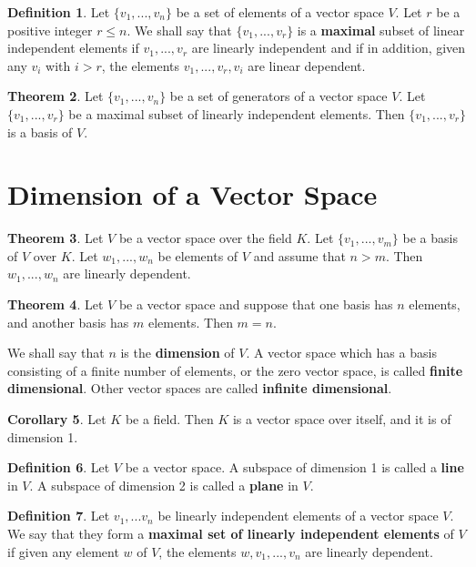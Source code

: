 \documentclass{book}
\theoremstyle{definition}
\newtheorem{definition}{Definition}[section]
\newtheorem{theorem}[definition]{Theorem}
\newtheorem{corollary}[definition]{Corollary}
\begin{document}
\begin{definition}
    Let $\{v_1, ..., v_n\}$ be a set of elements of a vector space $V$. Let $r$ be a positive integer $r \leq n$. We shall say that $\{v_1, ..., v_r\}$ is a \textbf{maximal} subset of linear independent elements if $v_1,...,v_r$ are linearly independent and if in addition, given any $v_i$ with $i > r$, the elements $v_1,...,v_r,v_i$ are linear dependent.
\end{definition}
\begin{theorem}
Let $\{v_1,...,v_n\}$ be a set of generators of a vector space $V$. Let $\{v_1,...,v_r\}$ be a maximal subset of linearly independent elements. Then $\{v_1,...,v_r\}$ is a basis of $V$.
\end{theorem}
\section{Dimension of a Vector Space}
\begin{theorem}
Let $V$ be a vector space over the field $K$. Let $\{v_1,...,v_m\}$ be a basis of $V$ over $K$. Let $w_1,...,w_n$ be elements of $V$ and assume that $n > m$. Then $w_1,...,w_n$ are linearly dependent.
\end{theorem}
\begin{theorem}
Let $V$ be a vector space and suppose that one basis has $n$ elements, and another basis has $m$ elements. Then $m=n$.
\end{theorem}
We shall say that $n$ is the \textbf{dimension} of $V$. A vector space which has a basis consisting of a finite number of elements, or the zero vector space, is called \textbf{finite dimensional}. Other vector spaces are called \textbf{infinite dimensional}.
\begin{corollary}
Let $K$ be a field. Then $K$ is a vector space over itself, and it is of dimension 1.
\end{corollary}
\begin{definition}
    Let $V$ be a vector space. A subspace of dimension 1 is called a \textbf{line} in $V$. A subspace of dimension 2 is called a \textbf{plane} in $V$.
\end{definition}
\begin{definition}
    Let $v_1,...v_n$ be linearly independent elements of a vector space $V$. We say that they form a \textbf{maximal set of linearly independent elements} of $V$ if given any element $w$ of $V$, the elements $w, v_1, ..., v_n$ are linearly dependent.
\end{definition}
\end{document}
